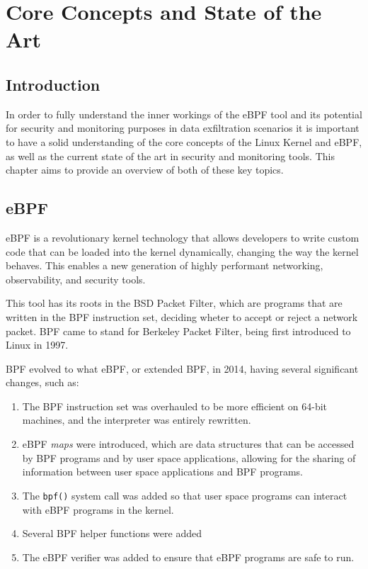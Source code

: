 \chapter{Core Concepts and State of the Art}

\section{Introduction}

In order to fully understand the inner workings of the eBPF tool and its potential for security and monitoring purposes in data exfiltration scenarios it is important to have a solid understanding of the core concepts of the Linux Kernel and eBPF, as well as the current state of the art in security and monitoring tools.
This chapter aims to provide an overview of both of these key topics.

\section{eBPF}

eBPF is a revolutionary kernel technology that allows developers to write custom code that can be loaded into the kernel dynamically, changing the way the kernel behaves. This enables a new generation of highly performant networking, observability, and security tools.

This tool has its roots in the BSD Packet Filter, which are programs that are written in the BPF instruction set, deciding wheter to accept or reject a network packet. BPF came to stand for Berkeley Packet Filter, being first introduced to Linux in 1997.

BPF evolved to what eBPF, or extended BPF, in 2014, having several significant changes, such as:
\begin{enumerate}
    \item The BPF instruction set was overhauled to be more efficient on 64-bit machines, and the interpreter was entirely rewritten.
    \item eBPF \textit{maps} were introduced, which are data structures that can be accessed by BPF programs and by user space applications, allowing for the sharing of information between user space applications and BPF programs.
    \item The \texttt{bpf()} system call was added so that user space programs can interact with eBPF programs in the kernel.
    \item Several BPF helper functions were added
    \item The eBPF verifier was added to ensure that eBPF programs are safe to run.
\end{enumerate}

